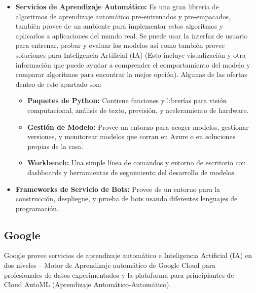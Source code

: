 \documentclass[12pt, a4paper, titlepage]{report}
\begin{document}
		\begin{itemize}
			\item \textbf{Servicios de Aprendizaje Automático:} Es una gran librería de algoritmos de aprendizaje automático pre-entrenados y pre-empacados, también provee de un ambiente para implementar estos algoritmos y aplicarlos a aplicaciones del mundo real. Se puede usar la interfaz de usuario para entrenar, probar y evaluar los modelos así como también provee soluciones para Inteligencia Artificial (IA) (Esto incluye visualización y otra información que puede ayudar a comprender el comportamiento del modelo y comparar algoritmos para encontrar la mejor opción). Algunas de las ofertas dentro de este apartado son:
			
			\begin{itemize}
				\item \textbf{Paquetes de Python:} Contiene funciones y librerías para visión computacional, análisis de texto, previsión, y aceleramiento de hardware. 
				\item \textbf{Gestión de Modelo:} Provee un entorno para acoger modelos, gestionar versiones, y monitorear modelos que corran en Azure o en soluciones propias de la casa.
				\item \textbf{Workbench:} Una simple línea de comandos y entorno de escritorio con dashboards y herramientas de seguimiento del desarrollo de modelos. 
			\end{itemize}
			
			\item \textbf{Frameworks de Servicio de Bots:} Provee de un entorno para la construcción, despliegue, y prueba  de bots usando diferentes lenguajes de programación.
		\end{itemize}
		
		\subsection{Google}
		Google provee servicios de aprendizaje automático e Inteligencia Artificial (IA) en dos niveles – Motor de Aprendizaje automático de Google Cloud para profesionales de datos experimentados y la plataforma para principiantes de Cloud AutoML (Aprendizaje Automático-Automático).
		
\end{document}
